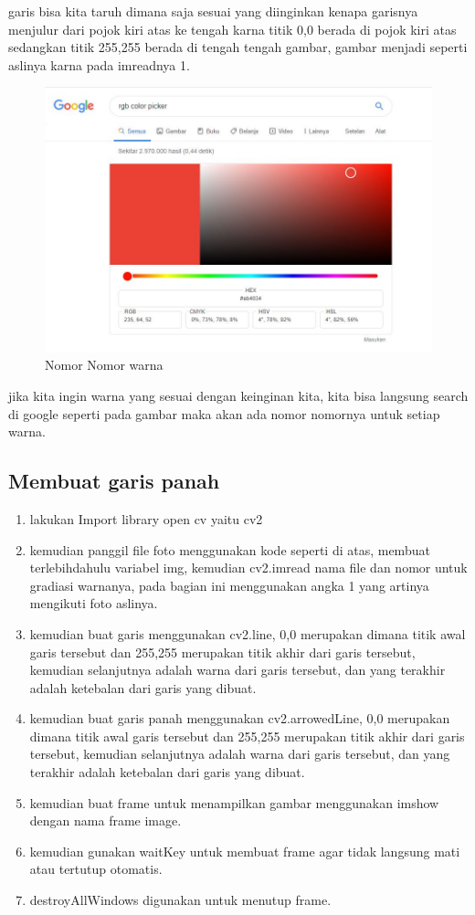 garis bisa kita taruh dimana saja sesuai yang diinginkan kenapa garisnya menjulur dari pojok kiri atas ke tengah karna titik 0,0 berada di pojok kiri atas sedangkan titik 255,255 berada di tengah tengah gambar, gambar menjadi seperti aslinya karna pada imreadnya 1.

\newpage
\begin{figure}[ht]
\centering
\includegraphics[scale=0.55]{figures/2,9,1.jpg}
\caption{Nomor Nomor warna}
\label{contoh}
\end{figure}

jika kita ingin warna yang sesuai dengan keinginan kita, kita bisa langsung search di google seperti pada gambar maka akan ada nomor nomornya untuk setiap warna.

\newpage
\subsection{Membuat garis panah}

\begin{enumerate}
	\item lakukan Import library open cv yaitu cv2
	\item kemudian panggil file foto menggunakan kode seperti di atas, membuat terlebihdahulu variabel img, kemudian cv2.imread nama file dan nomor untuk gradiasi warnanya, pada bagian ini menggunakan angka 1 yang artinya mengikuti foto aslinya.
	\item kemudian buat garis menggunakan cv2.line, 0,0 merupakan dimana titik awal garis tersebut dan 255,255 merupakan titik akhir dari garis tersebut, kemudian selanjutnya adalah warna dari garis tersebut, dan yang terakhir adalah ketebalan dari garis yang dibuat.
	\item kemudian buat garis panah menggunakan cv2.arrowedLine, 0,0 merupakan dimana titik awal garis tersebut dan 255,255 merupakan titik akhir dari garis tersebut, kemudian selanjutnya adalah warna dari garis tersebut, dan yang terakhir adalah ketebalan dari garis yang dibuat.
	\item kemudian buat frame untuk menampilkan gambar menggunakan imshow dengan nama frame image.
	\item kemudian gunakan waitKey untuk membuat frame agar tidak langsung mati atau tertutup otomatis.
	\item destroyAllWindows digunakan untuk menutup frame.
\end{enumerate}

